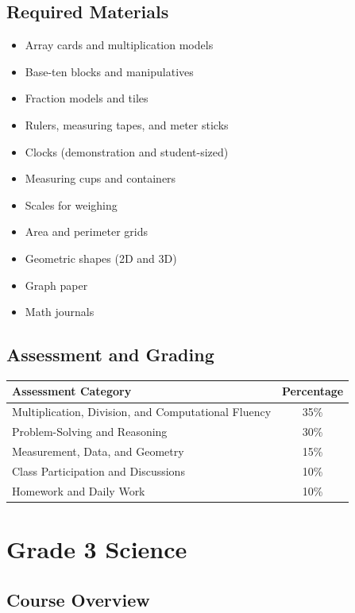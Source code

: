 \documentclass[11pt,letterpaper]{report}
\begin{document}
\section{Required Materials}

\begin{itemize}
    \item Array cards and multiplication models
    \item Base-ten blocks and manipulatives
    \item Fraction models and tiles
    \item Rulers, measuring tapes, and meter sticks
    \item Clocks (demonstration and student-sized)
    \item Measuring cups and containers
    \item Scales for weighing
    \item Area and perimeter grids
    \item Geometric shapes (2D and 3D)
    \item Graph paper
    \item Math journals
\end{itemize}

\section{Assessment and Grading}

\begin{center}
\begin{tabular}{|l|c|}
\hline
\textbf{Assessment Category} & \textbf{Percentage} \\
\hline
Multiplication, Division, and Computational Fluency & 35\% \\
\hline
Problem-Solving and Reasoning & 30\% \\
\hline
Measurement, Data, and Geometry & 15\% \\
\hline
Class Participation and Discussions & 10\% \\
\hline
Homework and Daily Work & 10\% \\
\hline
\end{tabular}
\end{center}

\chapter{Grade 3 Science}

\section{Course Overview}
\end{document}
